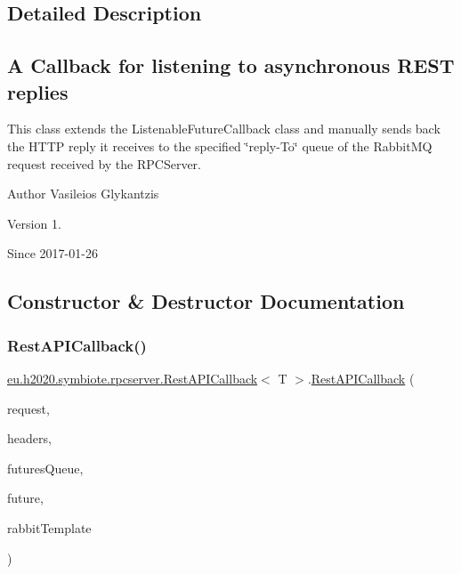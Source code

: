 \subsection{Detailed Description}
\subsection*{A Callback for listening to asynchronous R\+E\+ST replies }

This class extends the Listenable\+Future\+Callback class and manually sends back the H\+T\+TP reply it receives to the specified \char`\"{}reply-\/\+To\char`\"{} queue of the Rabbit\+MQ request received by the R\+P\+C\+Server.

\begin{DoxyAuthor}{Author}
Vasileios Glykantzis 
\end{DoxyAuthor}
\begin{DoxyVersion}{Version}
1. 
\end{DoxyVersion}
\begin{DoxySince}{Since}
2017-\/01-\/26 
\end{DoxySince}


\subsection{Constructor \& Destructor Documentation}
\mbox{\label{classeu_1_1h2020_1_1symbiote_1_1rpcserver_1_1RestAPICallback_ad5c5d0f8a589e0555039a1742642789a}} 
\subsubsection{\texorpdfstring{Rest\+A\+P\+I\+Callback()}{RestAPICallback()}}
{\footnotesize\ttfamily \hyperlink{classeu_1_1h2020_1_1symbiote_1_1rpcserver_1_1RestAPICallback}{eu.\+h2020.\+symbiote.\+rpcserver.\+Rest\+A\+P\+I\+Callback}$<$ T $>$.\hyperlink{classeu_1_1h2020_1_1symbiote_1_1rpcserver_1_1RestAPICallback}{Rest\+A\+P\+I\+Callback} (\begin{DoxyParamCaption}\item[{String}]{request,  }\item[{Map$<$ String, String $>$}]{headers,  }\item[{Queue$<$ Listenable\+Future$<$ Response\+Entity$<$ J\+S\+O\+N\+Object $>$$>$$>$}]{futures\+Queue,  }\item[{Listenable\+Future$<$ Response\+Entity$<$ J\+S\+O\+N\+Object $>$$>$}]{future,  }\item[{Rabbit\+Template}]{rabbit\+Template }\end{DoxyParamCaption})}

